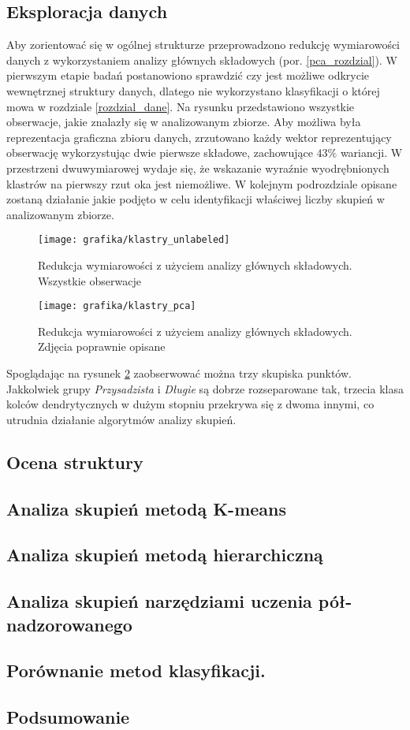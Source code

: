\documentclass{article}
\begin{document}
\subsection{Eksploracja danych}
Aby zorientować się w ogólnej strukturze przeprowadzono redukcję wymiarowości danych z wykorzystaniem analizy głównych składowych (por. \ref{pca_rozdzial}).
W pierwszym etapie badań postanowiono sprawdzić czy jest możliwe odkrycie wewnętrznej struktury danych, dlatego nie wykorzystano klasyfikacji o której mowa w rozdziale \ref{rozdzial_dane}.
Na rysunku przedstawiono wszystkie obserwacje, jakie znalazły się w analizowanym zbiorze.  
Aby możliwa była reprezentacja graficzna zbioru danych, zrzutowano każdy wektor reprezentujący obserwację wykorzystując dwie pierwsze składowe, zachowujące $43\%$ wariancji.
W przestrzeni dwuwymiarowej wydaje się, że wskazanie wyraźnie wyodrębnionych klastrów na pierwszy rzut oka jest niemożliwe. 
W kolejnym podrozdziale opisane zostaną działanie jakie podjęto w celu identyfikacji właściwej liczby skupień w analizowanym zbiorze.
\begin{figure}
\caption{Redukcja wymiarowości z użyciem analizy głównych składowych. Wszystkie obserwacje}
\label{rys_pca_unlabeled}
\texttt{[image: grafika/klastry\_unlabeled]}
\end{figure}



\begin{figure}
\caption{Redukcja wymiarowości z użyciem analizy głównych składowych. Zdjęcia poprawnie opisane}
\label{pca_opisane}
\texttt{[image: grafika/klastry\_pca]}
\end{figure}

Spoglądając na rysunek \ref{pca_opisane} zaobserwować można trzy skupiska punktów. Jakkolwiek grupy \textit{Przysadzista} i \textit{Długie} są dobrze rozseparowane tak, trzecia klasa kolców dendrytycznych w dużym stopniu przekrywa się z dwoma innymi, co utrudnia działanie algorytmów analizy skupień.
\subsection{Ocena struktury}

\subsection{Analiza skupień metodą K-means}
\subsection{Analiza skupień metodą hierarchiczną}
\subsection{Analiza skupień narzędziami uczenia pół-nadzorowanego}
\subsection{Porównanie metod klasyfikacji.}
\subsection{Podsumowanie}



\end{document}
